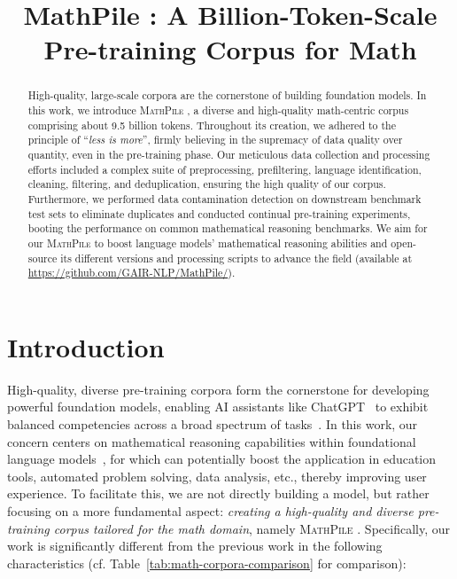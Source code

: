 \title{{MathPile }: A Billion-Token-Scale Pre-training Corpus for Math}

\begin{abstract}
High-quality, large-scale corpora are the cornerstone of building foundation models. In this work, we introduce {\textsc{MathPile }}, a diverse and high-quality math-centric corpus comprising about 9.5 billion tokens. Throughout its creation, we adhered to the principle of ``\emph{less is more}'', firmly believing in the supremacy of data quality over quantity, even in the pre-training phase. Our meticulous data collection and processing efforts included a complex suite of preprocessing, prefiltering, language identification, cleaning, filtering, and deduplication, ensuring the high quality of our corpus. Furthermore, we performed data contamination detection on downstream benchmark test sets to eliminate duplicates and conducted continual pre-training experiments, booting the performance on common mathematical reasoning benchmarks. We aim for our {\textsc{MathPile }} to boost language models' mathematical reasoning abilities and open-source its different versions and processing scripts to advance the field (available at \url{https://github.com/GAIR-NLP/MathPile/}).
\end{abstract}

\section{Introduction}

High-quality, diverse pre-training corpora form the cornerstone for developing powerful foundation models, enabling AI assistants like ChatGPT~\citep{openai-chatgpt} to exhibit balanced competencies across a broad spectrum of tasks~\citep{DBLP:journals/corr/abs-2303-12712-sparks-agi}. In this work, our concern centers on mathematical reasoning capabilities within foundational language models~\citep[][\emph{inter alia}]{abel,DBLP:journals/corr/abs-2310-10631-proofpile-2}, for which can potentially boost the application in education tools, automated problem solving, data analysis, etc., thereby improving user experience. To facilitate this, we are not directly building a model, but rather focusing on a more fundamental aspect: \emph{creating a high-quality and diverse pre-training corpus tailored for the math domain}, namely {\textsc{MathPile }}. Specifically, our work is significantly different from the previous work in the following characteristics (cf. Table~\ref{tab:math-corpora-comparison} for comparison):

